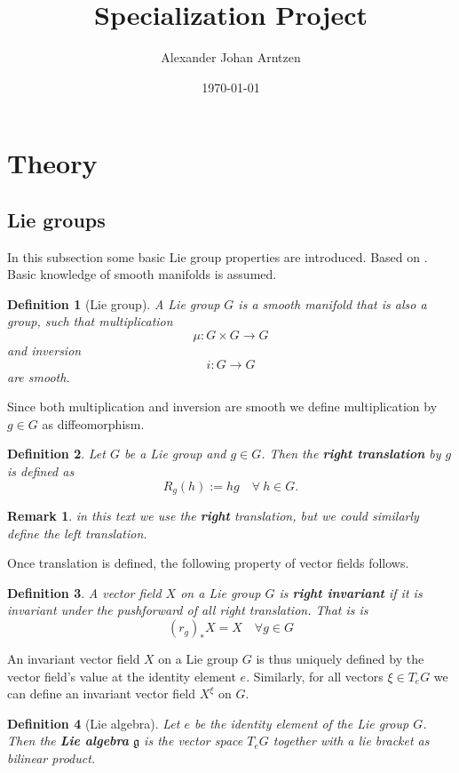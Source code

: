 \documentclass[a4paper]{article}
\title{Specialization Project}
\author{Alexander Johan Arntzen }
\date{\today}
\newtheorem{definition}{Definition}[section]
\newtheorem*{remark}{Remark}
\begin{document}
\maketitle

\section{Theory}
\subsection{Lie groups}
In this subsection some basic Lie group properties are introduced. Based on \cite{celledoni2016}. Basic knowledge of smooth manifolds is assumed. 
\begin{definition}[Lie group]
  A Lie group $G$ is a smooth manifold that is also a group, such that multiplication
  \begin{equation}
    \mu : G \times G \rightarrow G  
  \end{equation}
  and inversion
  \begin{equation}
    i : G  \rightarrow G  
  \end{equation}
  are smooth. 
\end{definition}
Since both  multiplication and inversion are smooth we define multiplication by $g \in G$ as diffeomorphism.
\begin{definition}
  Let $G$ be a Lie group and $g \in G$. Then the \textbf{right translation} by $g$ is defined as
  \begin{equation}
    R_g(h):= hg \quad  \forall \ h  \in G.
  \end{equation}
\end{definition}
\begin{remark}
  in this text we use the \textbf{right} translation, but we could similarly define the left translation. 
\end{remark}
Once translation is defined, the following property of vector fields follows. 
\begin{definition}
  A vector field $X$ on a Lie group $G$ is \textbf{right invariant} if it is invariant under the pushforward of all right translation. That is is
  \begin{equation}
    (r_g)_*X = X  \quad \forall g \in G 
  \end{equation}
\end{definition}
An invariant vector field $X$ on a Lie group $G$ is thus uniquely defined by the vector field's value at the identity element $e$. Similarly, for all vectors $\xi \in T_eG$ we can define an invariant vector field  $X^{\xi}$ on $G$. 
\begin{definition}[Lie algebra]
  Let $e$ be the identity element of the Lie group $G$. Then the \textbf{Lie algebra} $\mathfrak{g}$ is the vector space $T_eG$ together with a lie bracket as bilinear product.  
\end{definition}
\end{document}
